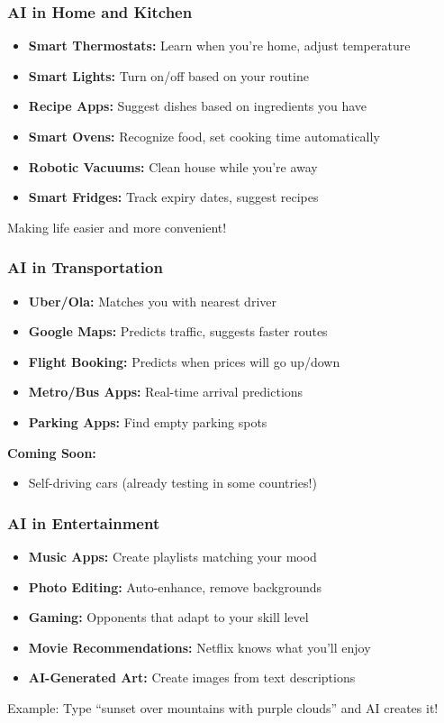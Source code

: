 \begin{frame}[fragile]\frametitle{AI in Home and Kitchen}

\begin{itemize}
\item {\bf Smart Thermostats:} Learn when you're home, adjust temperature
\item {\bf Smart Lights:} Turn on/off based on your routine
\item {\bf Recipe Apps:} Suggest dishes based on ingredients you have
\item {\bf Smart Ovens:} Recognize food, set cooking time automatically
\item {\bf Robotic Vacuums:} Clean house while you're away
\item {\bf Smart Fridges:} Track expiry dates, suggest recipes
\end{itemize}

Making life easier and more convenient!
\end{frame}

\begin{frame}[fragile]\frametitle{AI in Transportation}

\begin{itemize}
\item {\bf Uber/Ola:} Matches you with nearest driver
\item {\bf Google Maps:} Predicts traffic, suggests faster routes
\item {\bf Flight Booking:} Predicts when prices will go up/down
\item {\bf Metro/Bus Apps:} Real-time arrival predictions
\item {\bf Parking Apps:} Find empty parking spots
\end{itemize}

{\bf Coming Soon:}
\begin{itemize}
\item Self-driving cars (already testing in some countries!)
\end{itemize}
\end{frame}

\begin{frame}[fragile]\frametitle{AI in Entertainment}

\begin{itemize}
\item {\bf Music Apps:} Create playlists matching your mood
\item {\bf Photo Editing:} Auto-enhance, remove backgrounds
\item {\bf Gaming:} Opponents that adapt to your skill level
\item {\bf Movie Recommendations:} Netflix knows what you'll enjoy
\item {\bf AI-Generated Art:} Create images from text descriptions
\end{itemize}

Example: Type ``sunset over mountains with purple clouds'' and AI creates it!
\end{frame}

